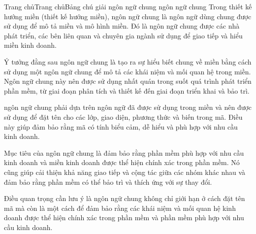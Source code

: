 
Trang chủTrang chủBảng chú giải ngôn ngữ chung
ngôn ngữ chung
Trong thiết kế hướng miền (thiết kế hướng miền), ngôn ngữ chung là ngôn ngữ dùng chung được sử dụng để mô tả miền và mô hình miền. Đó là ngôn ngữ chung được các nhà phát triển, các bên liên quan và chuyên gia ngành sử dụng để giao tiếp và hiểu miền kinh doanh.

Ý tưởng đằng sau ngôn ngữ chung là tạo ra sự hiểu biết chung về miền bằng cách sử dụng một ngôn ngữ chung để mô tả các khái niệm và mối quan hệ trong miền. Ngôn ngữ chung này nên được sử dụng nhất quán trong suốt quá trình phát triển phần mềm, từ giai đoạn phân tích và thiết kế đến giai đoạn triển khai và bảo trì.

ngôn ngữ chung phải dựa trên ngôn ngữ đã được sử dụng trong miền và nên được sử dụng để đặt tên cho các lớp, giao diện, phương thức và biến trong mã. Điều này giúp đảm bảo rằng mã có tính biểu cảm, dễ hiểu và phù hợp với nhu cầu kinh doanh.

Mục tiêu của ngôn ngữ chung là đảm bảo rằng phần mềm phù hợp với nhu cầu kinh doanh và miền kinh doanh được thể hiện chính xác trong phần mềm. Nó cũng giúp cải thiện khả năng giao tiếp và cộng tác giữa các nhóm khác nhau và đảm bảo rằng phần mềm có thể bảo trì và thích ứng với sự thay đổi.

Điều quan trọng cần lưu ý là ngôn ngữ chung không chỉ giới hạn ở cách đặt tên mã mà còn là một cách để đảm bảo rằng các khái niệm và mối quan hệ kinh doanh được thể hiện chính xác trong phần mềm và phần mềm phù hợp với nhu cầu kinh doanh.

